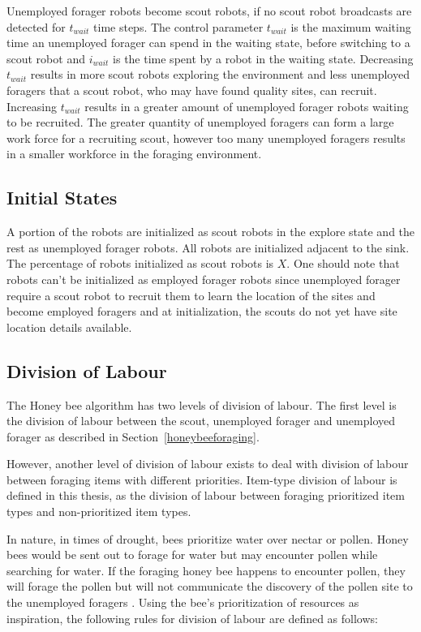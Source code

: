 Unemployed forager robots become scout robots, if no scout robot broadcasts are detected for $t_{wait}$ time steps. The control parameter $t_{wait}$ is the maximum waiting time an unemployed forager can spend in the waiting state, before switching to a scout robot and $i_{wait}$ is the time spent by a robot in the waiting state. Decreasing $t_{wait}$ results in more scout robots exploring the environment and less unemployed foragers that a scout robot, who may have found quality sites, can recruit. Increasing $t_{wait}$ results in a greater amount of unemployed forager robots waiting to be recruited. The greater quantity of unemployed foragers can form a large work force for a recruiting scout, however too many unemployed foragers results in a smaller workforce in the foraging environment.

\subsection{Initial States}

A portion of the robots are initialized as scout robots in the explore state and the rest as unemployed forager robots. All robots are initialized adjacent to the sink. The percentage of robots initialized as scout robots is $X$. One should note that robots can't be initialized as employed forager robots since unemployed forager require a scout robot to recruit them to learn the location of the sites and become employed foragers and at initialization, the scouts do not yet have site location details available.

\subsection{Division of Labour}
\label{natureinspired:divisionoflabour}
The Honey bee algorithm has two levels of division of labour. The first level is the division of labour between the scout, unemployed forager and unemployed forager as described in Section~\ref{honeybeeforaging}.

However, another level of division of labour exists to deal with division of labour between foraging items with different priorities. Item-type division of labour is defined in this thesis, as the division of labour between foraging prioritized item types and non-prioritized item types.

In nature, in times of drought, bees prioritize water over nectar or pollen. Honey bees would be sent out to forage for water but may encounter pollen while searching for water. If the foraging honey bee happens to encounter pollen, they will forage the pollen but will not communicate the discovery of the pollen site to the unemployed foragers \cite{seeley2009wisdom}. Using the bee's prioritization of resources as inspiration, the following rules for division of labour are defined as follows:

